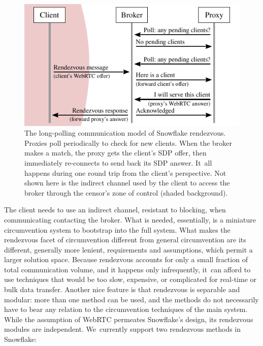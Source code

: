 \documentclass[letterpaper,twocolumn]{article}
\begin{document}
\begin{figure}
\includegraphics{figures/rendezvous/rendezvous}
\caption{
The long-polling communication model of Snowflake rendezvous.
Proxies poll periodically to check for new clients.
When the broker makes a match,
the proxy gets the client's SDP offer,
then immediately re-connects to send back its SDP answer.
It~all happens during one round trip from the client's perspective.
Not shown here is the indirect channel
used by the client to access the broker through the censor's zone of control
(shaded background).
}
\label{fig:rendezvous}
\end{figure}

The client needs to use an indirect channel,
resistant to blocking,
when communicating contacting the broker.
What is needed, essentially,
is a miniature circumvention system
to bootstrap into the full system.
What makes the rendezvous facet of circumvention
different from general circumvention
are its different, generally more lenient, requirements and assumptions,
which permit a larger solution space.
Because rendezvous accounts for only a small fraction
of total communication volume,
and it happens only infrequently,
it~can afford to use techniques that would be
too slow, expensive, or complicated
for real-time or bulk data transfer.
Another nice feature is that rendezvous is separable and modular:
more than one method can be used,
and the methods do not necessarily have to bear any relation
to the circumvention techniques of the main system.
While the assumption of WebRTC permeates Snowflake's design,
its rendezvous modules are independent.
We~currently support two rendezvous methods in Snowflake:
\end{document}
